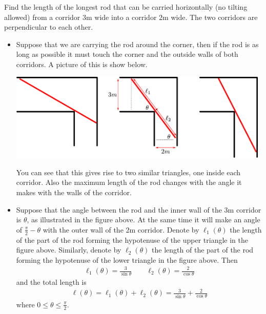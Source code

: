 \begin{eg}\label{APPglobalMaxMinJ}
Find the length of the longest rod that can be carried horizontally (no
tilting allowed) from a corridor $3$m wide into a corridor $2$m wide.
The two corridors are perpendicular to each other.


\soln
\begin{itemize}
 \item Suppose that we are carrying the rod around the corner, then if the rod is as long
as possible it must touch the corner and the outside walls of both corridors. A
picture of this is show below.
\begin{efig}
\begin{center}
   \includegraphics[height=4.2cm]{extra/corridor}
\end{center}
\end{efig}
You can see that this gives rise to two similar triangles, one inside each corridor. Also
the maximum length of the rod changes with the angle it makes with the walls of the
corridor.

\item Suppose that the angle between the rod and the inner wall of the $3$m
corridor is $\theta$, as illustrated in the figure above. At the same time it will make an
angle of $\frac{\pi}{2}-\theta$ with the outer wall of the 2m corridor. Denote by
$\ell_1(\theta)$ the length of the part of the rod forming the hypotenuse of the upper
triangle in the figure above. Similarly, denote by $\ell_2(\theta)$ the length of the part
of the rod forming the hypotenuse of the lower triangle in the figure above.  Then
\begin{align*}
\ell_1(\theta) = \frac{3}{\sin\theta}\qquad
\ell_2(\theta) = \frac{2}{\cos\theta}
\end{align*}
and the total length is
\begin{align*}
\ell(\theta) = \ell_1(\theta) +\ell_2(\theta)
             = \frac{3}{\sin\theta}+\frac{2}{\cos\theta}
\end{align*}
where $0 \leq \theta \leq \frac{\pi}{2}$.


\end{itemize}
\end{eg}
